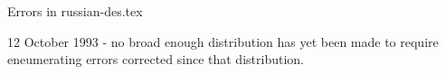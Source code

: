 
		Errors in russian-des.tex	

12 October 1993 - no broad enough distribution has yet been made to
	require eneumerating errors corrected since that distribution.


